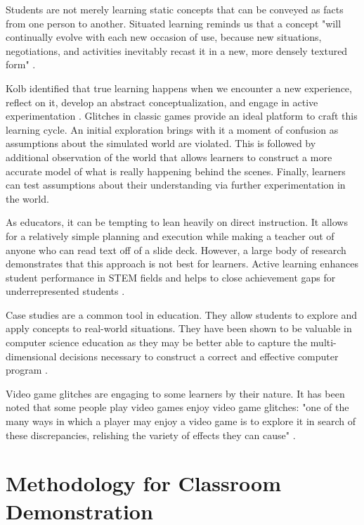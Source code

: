 \documentclass[letterpaper]{article}
\begin{document}
Students are not merely learning static concepts that can be conveyed as facts from one person to another. Situated learning reminds us that a concept "will continually evolve with each new occasion of use, because new situations, negotiations, and activities inevitably recast it in a new, more densely textured form" \cite{brown1989situated}.

Kolb identified that true learning happens when we encounter a new experience, reflect on it, develop an abstract conceptualization, and engage in active experimentation \cite{kolb84}. Glitches in classic games provide an ideal platform to craft this learning cycle. An initial exploration brings with it a moment of confusion as assumptions about the simulated world are violated. This is followed by additional observation of the world that allows learners to construct a more accurate model of what is really happening behind the scenes. Finally, learners can test assumptions about their understanding via further experimentation in the world.

As educators, it can be tempting to lean heavily on direct instruction. It allows for a relatively simple planning and execution while making a teacher out of anyone who can read text off of a slide deck. However, a large body of research demonstrates that this approach is not best for learners. Active learning enhances student performance in STEM fields \cite{freeman2014active} and helps to close achievement gaps for underrepresented students \cite{theobald2020active}.

Case studies are a common tool in education. They allow students to explore and apply concepts to real-world situations. They have been shown to be valuable in computer science education as they may be better able to capture the multi-dimensional decisions necessary to construct a correct and effective computer program \cite{linn1992case}.

Video game glitches are engaging to some learners by their nature. It has been noted that some people play video games enjoy video game glitches: "one of the many ways in which a player may enjoy a video game is to explore it in search of these discrepancies, relishing the variety of effects they can cause" \cite{bainbridge2007creative}.

\section{Methodology for Classroom Demonstration}
\end{document}

